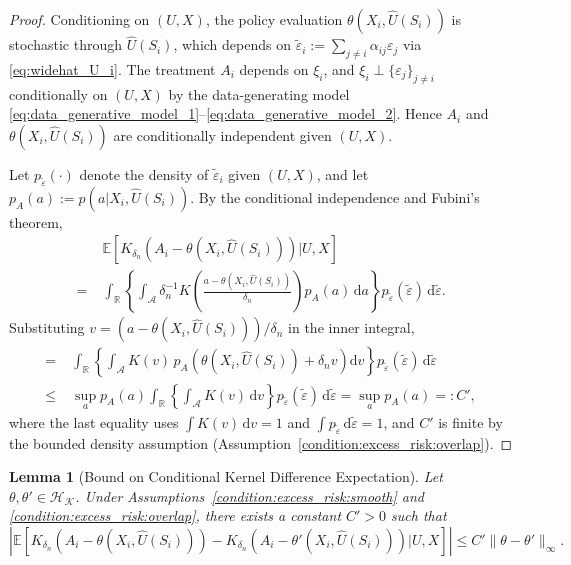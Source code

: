 \documentclass[12pt]{article}
\newtheorem{lemma}{Lemma}%
\newcommand{\E}{\mathbb{E}}
\newcommand{\R}{\mathbb{R}}
\begin{document}
\begin{proof}
Conditioning on $(U,X)$, the policy evaluation $\theta(X_i,\widehat{U}(S_i))$ is stochastic through $\widehat{U}(S_i)$, which depends on $\tilde\varepsilon_i := \sum_{j\neq i}\alpha_{ij}\varepsilon_j$ via \eqref{eq:widehat_U_i}.  The treatment $A_i$ depends on $\xi_i$, and $\xi_i\perp\{\varepsilon_j\}_{j\neq i}$ conditionally on $(U,X)$ by the data-generating model \eqref{eq:data_generative_model_1}--\eqref{eq:data_generative_model_2}.  Hence $A_i$ and $\theta(X_i,\widehat{U}(S_i))$ are conditionally independent given $(U,X)$.

Let $p_{\tilde\varepsilon}(\cdot)$ denote the density of $\tilde\varepsilon_i$ given $(U,X)$, and let $p_A(a) := p(a|X_i,\widehat{U}(S_i))$.  By the conditional independence and Fubini's theorem,
\begin{align*}
&\E\!\left[K_{\delta_n}\!\left(A_i-\theta(X_i,\widehat{U}(S_i))\right)\bigg|U,X\right]\\
= \;&\int_{\R}\left\{\int_{\mathcal{A}}\delta_n^{-1}K\!\left(\frac{a-\theta(X_i,\widehat{U}(S_i))}{\delta_n}\right)p_A(a)\,\mathrm{d}a\right\}p_{\tilde\varepsilon}(\tilde\varepsilon)\,\mathrm{d}\tilde\varepsilon.
\end{align*}
Substituting $v = (a - \theta(X_i,\widehat{U}(S_i)))/\delta_n$ in the inner integral,
\begin{align*}
= \;&\int_{\R}\left\{\int_{\mathcal{A}}K(v)\,p_A\!\left(\theta(X_i,\widehat{U}(S_i))+\delta_n v\right)\mathrm{d}v\right\}p_{\tilde\varepsilon}(\tilde\varepsilon)\,\mathrm{d}\tilde\varepsilon\\
\leq \;&\sup_{a}p_A(a)\int_{\R}\left\{\int_{\mathcal{A}}K(v)\,\mathrm{d}v\right\}p_{\tilde\varepsilon}(\tilde\varepsilon)\,\mathrm{d}\tilde\varepsilon
= \sup_{a}p_A(a) =: C',
\end{align*}
where the last equality uses $\int K(v)\,\mathrm{d}v=1$ and $\int p_{\tilde\varepsilon}\,\mathrm{d}\tilde\varepsilon=1$, and $C'$ is finite by the bounded density assumption (Assumption~\ref{condition:excess_risk:overlap}).
\end{proof}

\begin{lemma}[Bound on Conditional Kernel Difference Expectation]\label{lemma:kernel_exp_diff}
Let $\theta,\theta'\in\mathcal{H}_\mathcal{K}$.  Under Assumptions~\ref{condition:excess_risk:smooth} and \ref{condition:excess_risk:overlap}, there exists a constant $C'>0$ such that
$$\left|\E\!\left[K_{\delta_n}\!\left(A_i-\theta(X_i,\widehat{U}(S_i))\right) - K_{\delta_n}\!\left(A_i-\theta'(X_i,\widehat{U}(S_i))\right)\bigg|U,X\right]\right| \leq C'\|\theta-\theta'\|_\infty.$$
\end{lemma}
\end{document}
